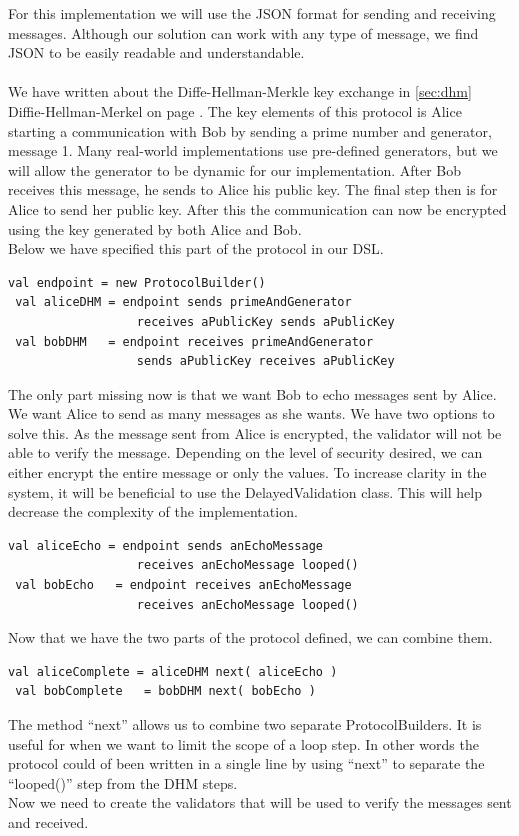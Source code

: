 For this implementation we will use the JSON format for sending and receiving messages. Although our solution can work with any type of message, we find JSON to be easily readable and understandable.
\\\\
We have written about the Diffe-Hellman-Merkle key exchange in \ref{sec:dhm} Diffie-Hellman-Merkel on page \pageref{sec:dhm}. The key elements of this protocol is Alice starting a communication with Bob by sending a prime number and generator, message 1. Many real-world implementations use pre-defined generators, but we will allow the generator to be dynamic for our implementation. After Bob receives this message, he sends to Alice his public key. The final step then is for Alice to send her public key. After this the communication can now be encrypted using the key generated by both Alice and Bob.
\\ 
Below we have specified this part of the protocol in our DSL.
\begin{lstlisting}[style=myScalastyle]
 val endpoint = new ProtocolBuilder()
 val aliceDHM = endpoint sends primeAndGenerator 
                  receives aPublicKey sends aPublicKey
 val bobDHM   = endpoint receives primeAndGenerator 
                  sends aPublicKey receives aPublicKey
\end{lstlisting}
The only part missing now is that we want Bob to echo messages sent by Alice. We want Alice to send as many messages as she wants. We have two options to solve this. As the message sent from Alice is encrypted, the validator will not be able to verify the message. Depending on the level of security desired, we can either encrypt the entire message or only the values. To increase clarity in the system, it will be beneficial to use the DelayedValidation class. This will help decrease the complexity of the implementation.

\begin{lstlisting}[style=myScalastyle]
 val aliceEcho = endpoint sends anEchoMessage 
                  receives anEchoMessage looped()
 val bobEcho   = endpoint receives anEchoMessage
                  receives anEchoMessage looped()
\end{lstlisting}

Now that we have the two parts of the protocol defined, we can combine them.
\begin{lstlisting}[style=myScalastyle]
 val aliceComplete = aliceDHM next( aliceEcho )
 val bobComplete   = bobDHM next( bobEcho )
\end{lstlisting}
The method ``next'' allows us to combine two separate ProtocolBuilders. It is useful for when we want to limit the scope of a loop step. In other words the protocol could of been written in a single line by using ``next'' to separate the ``looped()'' step from the DHM steps.
\\
Now we need to create the validators that will be used to verify the messages sent and received.

